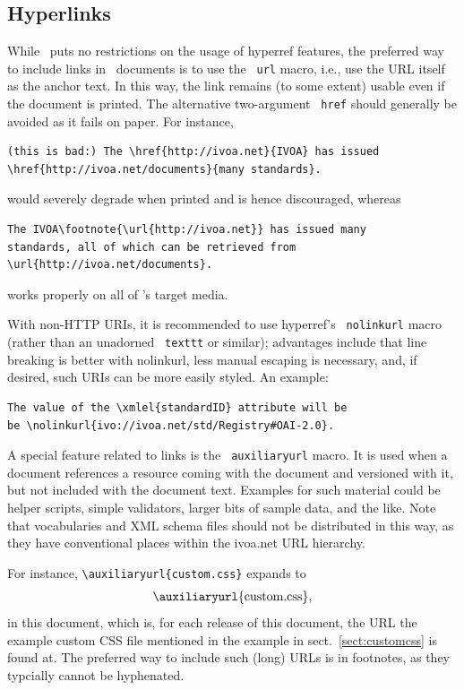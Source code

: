 \documentclass[11pt,a4paper]{ivoa}
\newcommand{\texword}[1]{\texttt{\color{texcolor} #1}}
\begin{document}
\subsection{Hyperlinks}
\label{sect:links}

While \ivoatex\ puts no restrictions on the usage of hyperref features,
the preferred way to include links in \ivoatex\ documents is to use the
\texword{url} macro, i.e., use the URL itself as the anchor text.  In
this way, the link remains (to some extent) usable even if the document
is printed.  The alternative two-argument \texword{href} should
generally be avoided as it fails on paper.  For instance,
\begin{lstlisting}
(this is bad:) The \href{http://ivoa.net}{IVOA} has issued
\href{http://ivoa.net/documents}{many standards}.
\end{lstlisting}
would severely degrade when printed and is hence discouraged, whereas
\begin{lstlisting}
The IVOA\footnote{\url{http://ivoa.net}} has issued many 
standards, all of which can be retrieved from 
\url{http://ivoa.net/documents}.
\end{lstlisting}
works properly on all of \ivoatex's target media.

With non-HTTP URIs, it is recommended to use hyperref's
\texword{nolinkurl} macro (rather than an unadorned \texword{texttt} or
similar); advantages include that line breaking is better with
nolinkurl, less manual escaping is necessary, and, if desired, 
such URIs can be more easily styled.  An example:

\begin{lstlisting}
The value of the \xmlel{standardID} attribute will be
be \nolinkurl{ivo://ivoa.net/std/Registry#OAI-2.0}.
\end{lstlisting}

A special feature related to links is the \texword{auxiliaryurl} macro.
It is used when a document references a resource coming with the
document and versioned with it, but not included with the document text.
Examples for such material could be helper scripts, simple validators,
larger bits of sample data, and the like.  Note that vocabularies and
XML schema files should not be distributed in this way, as they have
conventional places within the ivoa.net URL hierarchy.

For instance, \verb|\auxiliaryurl{custom.css}| expands to
$$\hbox{\auxiliaryurl{custom.css},}$$ in this document, 
which is, for each release of this
document, the URL the example custom CSS file mentioned in the example
in sect.~\ref{sect:customcss} is found at.  The preferred way to include
such (long) URLs is in footnotes, as they typcially cannot be hyphenated.
\end{document}
